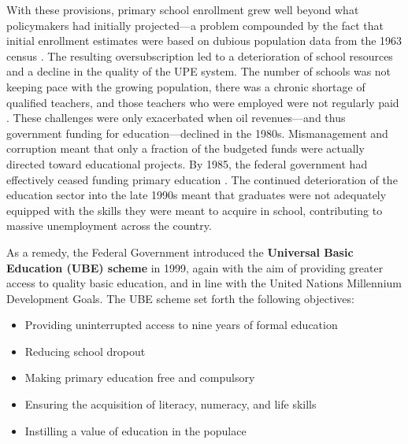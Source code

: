 With these provisions, primary school enrollment grew well beyond what
policymakers had initially projected---a problem compounded by the fact
that initial enrollment estimates were based on dubious population data
from the 1963 census \citep{csapo1983}. The resulting oversubscription
led to a deterioration of school resources and a decline in the quality
of the UPE system. The number of schools was not keeping pace with the
growing population, there was a chronic shortage of qualified teachers,
and those teachers who were employed were not regularly paid
\citep{babsfafunwa1992}. These challenges were only exacerbated when oil
revenues---and thus government funding for education---declined in the
1980s. Mismanagement and corruption meant that only a fraction of the
budgeted funds were actually directed toward educational projects. By
1985, the federal government had effectively ceased funding primary
education \citep{umar2003}. The continued deterioration of the education
sector into the late 1990s meant that graduates were not adequately
equipped with the skills they were meant to acquire in school, contributing
to massive unemployment across the country.

As a remedy, the Federal Government introduced the \textbf{Universal
Basic Education (UBE) scheme} in 1999, again with the aim of providing
greater access to quality basic education, and in line with the United
Nations Millennium Development Goals. The UBE scheme set forth the
following objectives:

\begin{itemize}
    \item Providing uninterrupted access to nine years of formal education
    \item Reducing school dropout
    \item Making primary education free and compulsory
    \item Ensuring the acquisition of literacy, numeracy, and life skills
    \item Instilling a value of education in the populace \citep{ubec_online}
\end{itemize}

